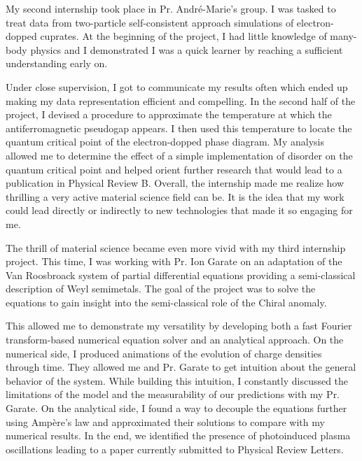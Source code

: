 \documentclass[11pt,a4paper,roman, total={5in, 4in}]{moderncv}
\begin{document}
My second internship took place in Pr. André-Marie's group. I was tasked to treat data from two-particle self-consistent approach simulations of electron-dopped cuprates. At the beginning of the project, I had little knowledge of many-body physics and I demonstrated I was a quick learner by reaching a sufficient understanding early on. 



Under close supervision, I got to communicate my results often which ended up making my data representation efficient and compelling. In the second half of the project, I devised a procedure to approximate the temperature at which the antiferromagnetic pseudogap appears. I then used this temperature to locate the quantum critical point of the electron-dopped phase diagram. My analysis allowed me to determine the effect of a simple implementation of disorder on the quantum critical point and helped orient further research that would lead to a publication in Physical Review B. Overall, the internship made me realize how thrilling a very active material science field can be. It is the idea that my work could lead directly or indirectly to new technologies that made it so engaging for me.\vspace{0.5cm} 

The thrill of material science became even more vivid with my third internship project. This time, I was working with Pr. Ion Garate on an adaptation of the Van Roosbroack system of partial differential equations providing a semi-classical description of Weyl semimetals. The goal of the project was to solve the equations to gain insight into the semi-classical role of the Chiral anomaly.


This allowed me to demonstrate my versatility by developing both a fast Fourier transform-based numerical equation solver and an analytical approach. On the numerical side, I produced animations of the evolution of charge densities through time. They allowed me and Pr. Garate to get intuition about the general behavior of the system. While building this intuition, I constantly discussed the limitations of the model and the measurability of our predictions with my Pr. Garate. On the analytical side, I found a way to decouple the equations further using Ampère's law and approximated their solutions to compare with my numerical results. In the end, we identified the presence of photoinduced plasma oscillations leading to a paper currently submitted to Physical Review Letters. 
\vspace{0.5cm}   
\end{document}
